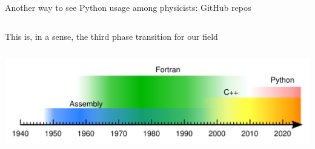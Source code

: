 \documentclass[aspectratio=169]{beamer}
\begin{document}
\begin{frame}{Another way to see Python usage among physicists: GitHub repos}
\begin{columns}
\end{columns}
\end{frame}

\begin{frame}{This is, in a sense, the third phase transition for our field}
\vspace{0.5 cm}
\begin{columns}
\includegraphics[width=\linewidth]{programming-languages.pdf}
\end{columns}
\end{frame}
\end{document}

